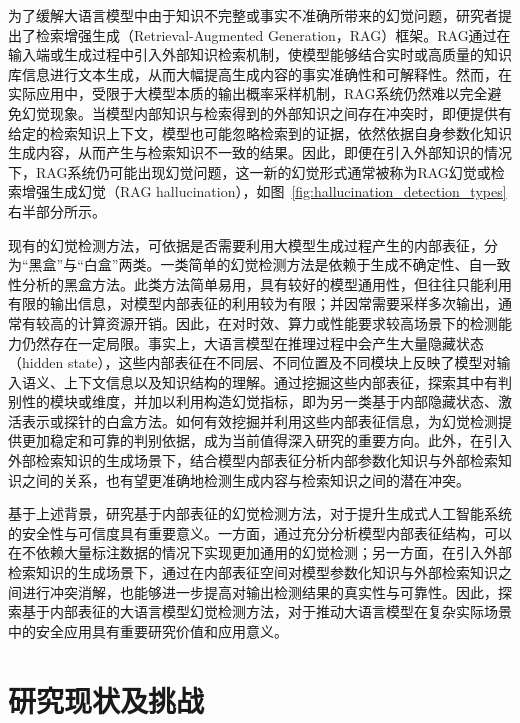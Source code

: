 为了缓解大语言模型中由于知识不完整或事实不准确所带来的幻觉问题，研究者提出了检索增强生成（Retrieval-Augmented Generation，RAG）\cite{gao2024retrieval,huang2024survey,wu2025retrieval}框架。RAG通过在输入端或生成过程中引入外部知识检索机制，使模型能够结合实时或高质量的知识库信息进行文本生成，从而大幅提高生成内容的事实准确性和可解释性。然而，在实际应用中，受限于大模型本质的输出概率采样机制，RAG系统仍然难以完全避免幻觉现象。当模型内部知识与检索得到的外部知识之间存在冲突时，即便提供有给定的检索知识上下文，模型也可能忽略检索到的证据，依然依据自身参数化知识生成内容，从而产生与检索知识不一致的结果。因此，即便在引入外部知识的情况下，RAG系统仍可能出现幻觉问题，这一新的幻觉形式通常被称为RAG幻觉或检索增强生成幻觉（RAG hallucination），如图~\ref{fig:hallucination_detection_types}右半部分所示。

现有的幻觉检测方法，可依据是否需要利用大模型生成过程产生的内部表征，分为“黑盒”与“白盒”两类。一类简单的幻觉检测方法是依赖于生成不确定性、自一致性分析的黑盒方法。此类方法简单易用，具有较好的模型通用性，但往往只能利用有限的输出信息，对模型内部表征的利用较为有限；并因常需要采样多次输出，通常有较高的计算资源开销。因此，在对时效、算力或性能要求较高场景下的检测能力仍然存在一定局限。事实上，大语言模型在推理过程中会产生大量隐藏状态（hidden state），这些内部表征在不同层、不同位置及不同模块上反映了模型对输入语义、上下文信息以及知识结构的理解。通过挖掘这些内部表征，探索其中有判别性的模块或维度，并加以利用构造幻觉指标，即为另一类基于内部隐藏状态、激活表示或探针的白盒方法。如何有效挖掘并利用这些内部表征信息，为幻觉检测提供更加稳定和可靠的判别依据，成为当前值得深入研究的重要方向\cite{skean2025layer,laptev2025analyze}。此外，在引入外部检索知识的生成场景下，结合模型内部表征分析内部参数化知识与外部检索知识之间的关系，也有望更准确地检测生成内容与检索知识之间的潜在冲突。

基于上述背景，研究基于内部表征的幻觉检测方法，对于提升生成式人工智能系统的安全性与可信度具有重要意义。一方面，通过充分分析模型内部表征结构，可以在不依赖大量标注数据的情况下实现更加通用的幻觉检测；另一方面，在引入外部检索知识的生成场景下，通过在内部表征空间对模型参数化知识与外部检索知识之间进行冲突消解，也能够进一步提高对输出检测结果的真实性与可靠性。因此，探索基于内部表征的大语言模型幻觉检测方法，对于推动大语言模型在复杂实际场景中的安全应用具有重要研究价值和应用意义。

\section{研究现状及挑战}\label{sec:current_status_and_challenges}

